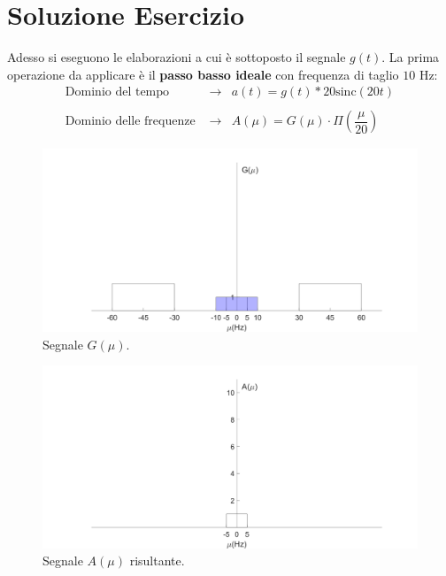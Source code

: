 \documentclass[a4paper]{article}
\begin{document}
	\section{Soluzione Esercizio}
	
	Adesso si eseguono le elaborazioni a cui è sottoposto il segnale $g\left(t\right)$. La prima operazione da applicare è il \textbf{passo basso ideale} con frequenza di taglio $10$ Hz:
	\begin{equation*}
		\begin{array}{lll}
			\text{Dominio del tempo } & \longrightarrow & a\left(t\right) = g\left(t\right) * 20\mathrm{sinc}\left(20t\right) \\
			&& \\
			\text{Dominio delle frequenze } & \longrightarrow & A\left(\mu\right) = G\left(\mu\right) \cdot \Pi\left(\dfrac{\mu}{20}\right)
		\end{array}
	\end{equation*}
	\begin{figure}[!htp]
		\centering
		\includegraphics[width=\textwidth]{img/segnale_G.PNG}
		\caption*{Segnale $G\left(\mu\right)$.}
	\end{figure}
	
	\begin{figure}[!htp]
		\centering
		\includegraphics[width=\textwidth]{img/segnale_A.PNG}
		\caption*{Segnale $A\left(\mu\right)$ risultante.}
	\end{figure}
	
\end{document}
